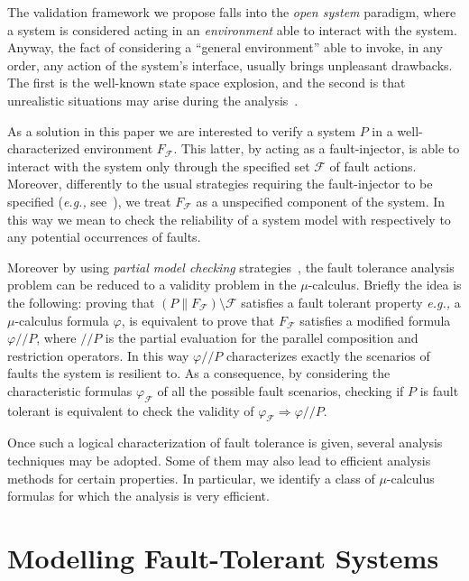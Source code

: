 \documentclass{entcs}
\newcommand{\eg}{\emph{e.g., }}
\newcommand{\quot}[1]{\slash\!\!\slash {#1}}
\newcommand{\Faults}{\mathcal{F}}
\newcommand{\faultinjector}{F_{\Faults}}
\begin{document}
The validation framework we propose falls into the \emph{open system}
paradigm, where a system is considered acting in an \emph{environment} able to
interact with the system. Anyway, the fact of considering a ``general
environment'' able to invoke, in any order, any action of the system's
interface, usually brings unpleasant drawbacks. The first is the well-known
state space explosion, and the second is that unrealistic situations may arise
during the analysis~\cite{GPB02:ase}.

As a solution in this paper we are interested to verify a system $P$ in a
well-characterized environment $\faultinjector$. This latter, by acting as a
fault-injector, is able to interact with the system only through the specified
set $\Faults$ of fault actions. Moreover, differently to the usual strategies
requiring the fault-injector to be specified (\eg see~\cite{TWM02:sac}), we
treat $\faultinjector$ as a unspecified component of the system. In this way
we mean to check the reliability of a system model with respectively to any
potential occurrences of faults.

Moreover by using \emph{partial model checking}
strategies~\cite{LICS::Andersen1995}, the fault tolerance analysis
problem can be reduced to a validity problem in the
$\mu$-calculus. Briefly the idea is the following: proving that $(P
\parallel \faultinjector) \setminus \Faults$ satisfies a fault
tolerant property \eg a $\mu$-calculus formula $\varphi$, is
equivalent to prove that $\faultinjector$ satisfies a modified formula
$\varphi \quot{P}$, where $\quot{P}$ is the partial
evaluation for the parallel composition and restriction operators. In
this way $\varphi \quot{P}$ characterizes exactly the
scenarios of faults the system is resilient to. As a consequence, by
considering the characteristic formulas $\varphi_{\Faults}$ of all the
possible fault scenarios, checking if $P$ is fault tolerant is
equivalent to check the validity of $\varphi_{\Faults} \Rightarrow
\varphi \quot{P}$.

Once such a logical characterization of fault tolerance is given, several
analysis techniques may be adopted. Some of them may also lead to efficient
analysis methods for certain properties. In particular, we identify a class of
$\mu$-calculus formulas for which the analysis is
very efficient.

\section{Modelling Fault-Tolerant Systems}
\label{modelingfts:sec}%
\end{document}
